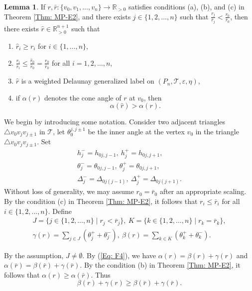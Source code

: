 \documentclass[12pt]{amsart}
\theoremstyle{definition}
\newtheorem{lemma}[theorem]{Lemma}
\begin{document}
\begin{lemma}\label{Lem: key}
If $r, \bar{r}: \{v_0, v_1, \dots, v_n\}
\rightarrow \mathbb{R}_{>0}$ satisfies conditions (a), (b), and (c) in Theorem \ref{Thm: MP-E2}, and there exists $j \in \{1, 2, \dots, n\}$ such that $\frac{r_j}{\bar{r}_j} < \frac{r_0}{\bar{r}_0}$, then there exists $\hat{r} \in \mathbb{R}_{>0}^{n+1}$ such that
\begin{enumerate}
\item[(a)] $\hat{r}_i \geq r_i$ for $i \in \{1, \dots, n\}$,
\item[(b)] $\frac{\hat{r}_i}{\bar{r}_i} \leq \frac{\hat{r}_0}{\bar{r}_0} = \frac{r_0}{\bar{r}_0}$ for all $i = 1, 2, \dots, n$,
\item[(c)] $\hat{r}$ is a weighted Delaunay generalized label on $(P_n, \mathcal{T}, \varepsilon, \eta)$,
\item[(d)] if $\alpha(r)$ denotes the cone angle of $r$ at $v_0$, then
    \begin{equation*}
    \alpha(\hat{r}) > \alpha(r).
    \end{equation*}
\end{enumerate}
\end{lemma}
\proof
We begin by introducing some notation. 
Consider two adjacent triangles $\triangle v_0v_jv_{j\pm1}$ in $\mathcal{T}$, 
let $\theta_0^{j,j\pm 1}$ be the inner angle at the vertex $v_0$ in the triangle $\triangle v_0v_jv_{j\pm 1}$. Set
\begin{gather*}
h_j^-=h_{0j,j-1},\
h_j^+=h_{0j,j+1},\\
\theta_j^-=\theta_{0j,j-1},\
\theta_j^+=\theta_{0j,j+1},\\
\Delta_j^-=\Delta_{0j(j-1)},\
\Delta_j^+=\Delta_{0j(j+1)}.
\end{gather*}
Without loss of generality, we may assume $r_0=\bar{r}_0$ after an appropriate scaling. 
By the condition (c) in Theorem \ref{Thm: MP-E2}, it follows that $r_i\le{\bar{r}_i}$ for all $i\in\{1,2,\dots,n\}$. 
Define
\begin{gather*}
J=\{j\in\{1,2,\dots,n\}\mid r_j<{\bar{r}_j}\},\
K=\{k\in\{1,2,\dots,n\}\mid r_k={\bar{r}_k}\},\\
\gamma(r)=\sum_{j\in{J}}(\theta_j^++\theta_j^-),\
\beta(r)=\sum_{k\in{K}}(\theta_k^++\theta_k^-).
\end{gather*}

By the assumption, $J\neq\emptyset$.
By (\ref{Eq: F4}), we have
$\alpha(r)=\beta(r)+\gamma(r)$ and $\alpha(\bar{r})=\beta(\bar{r})+\gamma(\bar{r})$.
By the condition (b) in Theorem \ref{Thm: MP-E2}, it follows that $\alpha(r) \geq \alpha(\bar{r})$. 
Thus
\begin{equation}\label{Eq: F5}
\beta(r)+\gamma(r)\geq\beta(\bar{r})+\gamma(\bar{r}).
\end{equation}
\end{document}
